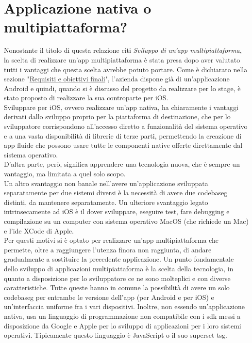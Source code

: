\section{Applicazione nativa o multipiattaforma?}
\label{sec:nativa-multipiattaforma}

Nonostante il titolo di questa relazione citi \emph{Sviluppo di un'app multipiattaforma}, la scelta di realizzare un'app multipiattaforma è stata presa dopo aver valutato tutti i vantaggi che questa scelta avrebbe potuto portare.
Come è dichiarato nella sezione "\hyperref[sec:requisiti-obiettivi-finali]{Requisiti e obiettivi finali}", l'azienda dispone già di un'applicazione Android e quindi, quando si è discusso del progetto da realizzare per lo stage, è stato proposto di realizzare la sua controparte per iOS.\\
Sviluppare per iOS, ovvero realizzare un'app nativa, ha chiaramente i vantaggi derivati dallo sviluppo proprio per la piattaforma di destinazione, che per lo sviluppatore corrispondono all'accesso diretto a funzionalità del sistema operativo e a una vasta disponibilità di librerie di terze parti, permettendo la creazione di app fluide che possono usare tutte le componenti native offerte direttamente dal sistema operativo.\\
D'altra parte, però, significa apprendere una tecnologia nuova, che è sempre un vantaggio, ma limitata a quel solo scopo.\\
Un altro svantaggio non banale nell'avere un'applicazione sviluppata separatamente per due sistemi diversi è la necessità di avere due \gls{codebaseg} distinti, da mantenere separatamente.
Un ulteriore svantaggio legato intrinsecamente ad iOS è il dover sviluppare, eseguire test, fare debugging e compilazione su un computer con sistema operativo MacOS (che richiede un Mac) e l'\gls{ide} XCode di Apple.\\
Per questi motivi si è optato per realizzare un'app multipiattaforma che permette, oltre a raggiungere l'utenza finora non raggiunta, di andare gradualmente a sostituire la precedente applicazione.
Un punto fondamentale dello sviluppo di applicazioni multipiattaforma è la scelta della tecnologia, in quanto a disposizione per lo sviluppatore ce ne sono molteplici e con diverse caratteristiche.
Tutte queste hanno in comune la possibilità di avere un solo \gls{codebaseg} per entrambe le versione dell'app (per Android e per iOS) e un'interfaccia uniforme fra i vari dispositivi.
Inoltre, non essendo un'applicazione nativa, usa un linguaggio di programmazione non compatibile con i \gls{sdk} messi a disposizione da Google e Apple per lo sviluppo di applicazioni per i loro sistemi operativi. Tipicamente questo linguaggio è JavaScript o il suo superset \gls{tsg}.
